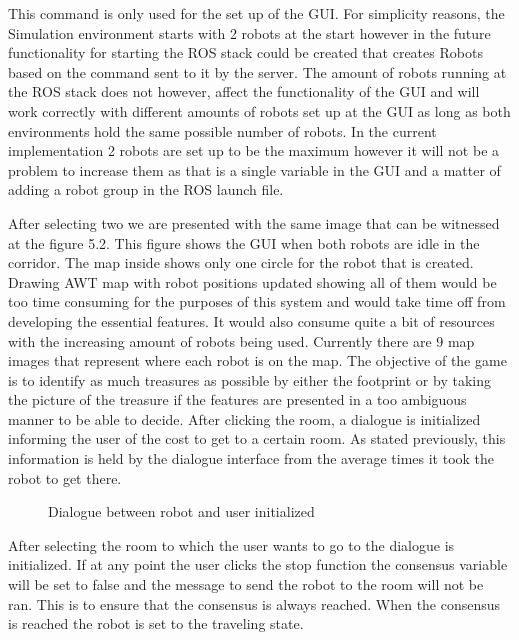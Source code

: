       This command is only used for the set up of the GUI. For simplicity reasons, the Simulation environment starts with 2 robots at the start however in the future functionality for starting the ROS stack could be created that creates Robots based on the command sent to it by the server. The amount of robots running at the ROS stack does not however, affect the functionality of the GUI and will work correctly with different amounts of robots set up at the GUI as long as both environments hold the same possible number of robots. In the current implementation 2 robots are set up to be the maximum however it will not be a problem to increase them as that is a single variable in the GUI and a matter of adding a robot group in the ROS launch file.

      After selecting two we are presented with the same image that can be witnessed at the figure 5.2. This figure shows the GUI when both robots are idle in the corridor. The map inside shows only one circle for the robot that is created. Drawing AWT map with robot positions updated showing all of them would be too time consuming for the purposes of this system and would take time off from developing the essential features. It would also consume quite a bit of resources with the increasing amount of robots being used. Currently there are 9 map images that represent where each robot is on the map. The objective of the game is to identify as much treasures as possible by either the footprint or by taking the picture of the treasure if the features are presented in a too ambiguous manner to be able to decide. After clicking the room, a dialogue is initialized informing the user of the cost to get to a certain room. As stated previously, this information is held by the dialogue interface from the average times it took the robot to get there.

      \begin{figure}[htp]
        \centering
        \caption{Dialogue between robot and user initialized}
      \end{figure}

      After selecting the room to which the user wants to go to the dialogue is initialized. If at any point the user clicks the stop function the consensus variable will be set to false and the message to send the robot to the room will not be ran. This is to ensure that the consensus is always reached. When the consensus is reached the robot is set to the traveling state.

